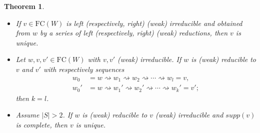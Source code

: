 \documentclass{amsart}
\newcommand{\fc}{{\mathrm{FC}}}
\newcommand{\red}{\rightsquigarrow}
\newtheorem{Theorem}{Theorem}[section]
\theoremstyle{definition}
\begin{document}
\begin{Theorem}\label{theorem:starope}\
    \begin{itemize}    
        \item[(a)] If $v\in \fc(W)$ is left (respectively, right) (weak) irreducible and obtained from $w$ by a series of left (respectively, right) (weak) reductions, then $v$ is unique.
        \item[(b)] Let $w,v,v'\in \fc(W)$ with $v,v'$ (weak) irreducible. If $w$ is (weak) reducible to $v$ and $v'$ with respectively sequences \begin{align} w_0&=w\red w_1\red w_2\red \cdots \red w_l=v, \label{eq:seq1}\\
    w_0'&=w\red w_1'\red w_2'\red \cdots \red w_k'=v' \label{eq:seq2};
    \end{align} then $k=l$. 
        \item[(c)] Assume $|S|>2$. If $w$ is (weak) reducible to $v$ (weak) irreducible and $supp(v)$ is complete, then $v$ is unique. 
    \end{itemize}
\end{Theorem}
\end{document}
